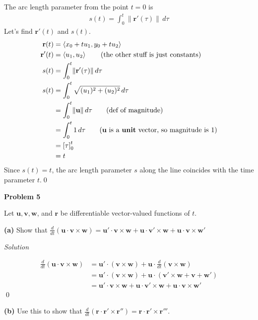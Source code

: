 \documentclass{article}
\newcommand{\lra}[1]{\left\langle #1 \right\rangle}
\newcommand{\lrb}[1]{\left[ #1 \right]}
\newcommand{\Solution}{\textit{Solution}}
\begin{document}
The arc length parameter from the point $t=0$ is
\begin{align*}
    s(t)=\int_0^{t}\lVert \mathbf{r}'(\tau)\rVert\,d\tau
\end{align*}
Let's find $\mathbf{r}'(t)$ and $s(t)$.
\begin{align*}
    \mathbf{r}(t)&=\lra{x_0 + tu_1, y_0+tu_2}\\
    \mathbf{r}'(t)&=\lra{u_1,u_2}\tag{the other stuff is just constants}\\
    s(t)&=\int_0^t\lVert\mathbf{r}'(\tau)\rVert\,d\tau\\
    s(t)&=\int_0^t \sqrt{(u_1)^2+(u_2)^2}\,d\tau\\\
    &=\int_0^t \lVert \mathbf{u}\rVert\,d\tau\tag{def of magnitude}\\
    &=\int_0^t 1 \,d\tau\tag{$\mathbf{u}$ is a \textbf{unit} vector, so magnitude is $1$}\\
    &=\lrb{\tau}_0^t\\
    &=t
\end{align*}
Since $s(t)=t$, the arc length parameter $s$ along the line coincides with the time parameter $t$.\qed

{}\textbf{Problem 5}

Let $\mathbf{u}, \mathbf{v}, \mathbf{w}$, and $\mathbf{r}$ be differentiable vector-valued functions of $t$.

{}
\textbf{(a)} Show that $\displaystyle\frac{d}{dt}\left(\mathbf{u}\cdot\mathbf{v}\times\mathbf{w}\right)=\mathbf{u}'\cdot\mathbf{v}\times\mathbf{w}+\mathbf{u}\cdot\mathbf{v}'\times\mathbf{w}+\mathbf{u}\cdot\mathbf{v}\times\mathbf{w}'$

\Solution

\begin{align*}
    \frac{d}{dt}\left(\mathbf{u}\cdot\mathbf{v}\times\mathbf{w}\right)&=\mathbf{u}'\cdot(\mathbf{v}\times\mathbf{w})+\mathbf{u}\cdot\frac{d}{dt}(\mathbf{v}\times\mathbf{w})\\
    &=\mathbf{u}'\cdot(\mathbf{v}\times\mathbf{w})+\mathbf{u}\cdot\left(\mathbf{v}'\times\mathbf{w}+\mathbf{v}+\mathbf{w}'\right)\\
    &=\mathbf{u}'\cdot\mathbf{v}\times\mathbf{w}+\mathbf{u}\cdot\mathbf{v}'\times\mathbf{w}+\mathbf{u}\cdot\mathbf{v}\times\mathbf{w}'
\end{align*}\qed

{}
\textbf{(b)} Use this to show that $\displaystyle\frac{d}{dt}\left(\mathbf{r}\cdot\mathbf{r}'\times\mathbf{r}''\right)=\mathbf{r}\cdot\mathbf{r}'\times\mathbf{r}'''$.
\end{document}
